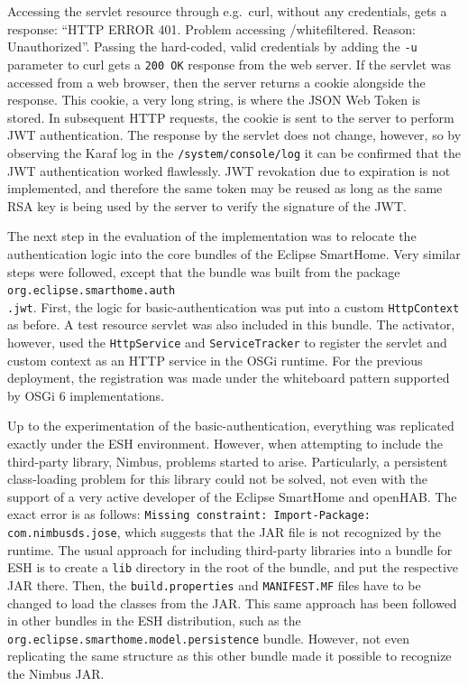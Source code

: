 \documentclass[12pt]{article}
\begin{document}
Accessing the servlet resource through e.g.\ curl, without any credentials, gets a response: ``HTTP ERROR 401. Problem accessing /whitefiltered. Reason: Unauthorized''. Passing the hard-coded, valid credentials by adding the \texttt{-u} parameter to curl gets a \texttt{200 OK} response from the web server. If the servlet was accessed from a web browser, then the server returns a cookie alongside the response. This cookie, a very long string, is where the JSON Web Token is stored. In subsequent HTTP requests, the cookie is sent to the server to perform JWT authentication. The response by the servlet does not change, however, so by observing the Karaf log in the \texttt{/system/console/log} it can be confirmed that the JWT authentication worked flawlessly. JWT revokation due to expiration is not implemented, and therefore the same token may be reused as long as the same RSA key is being used by the server to verify the signature of the JWT.

The next step in the evaluation of the implementation was to relocate the authentication logic into the core bundles of the Eclipse SmartHome. Very similar steps were followed, except that the bundle was built from the package \texttt{org.eclipse.smarthome.auth\\.jwt}. First, the logic for basic-authentication was put into a custom \texttt{HttpContext} as before. A test resource servlet was also included in this bundle. The activator, however, used the \texttt{HttpService} and \texttt{ServiceTracker} to register the servlet and custom context as an HTTP service in the OSGi runtime. For the previous deployment, the registration was made under the whiteboard pattern supported by OSGi 6 implementations.

Up to the experimentation of the basic-authentication, everything was replicated exactly under the ESH environment. However, when attempting to include the third-party library, Nimbus, problems started to arise. Particularly, a persistent class-loading problem for this library could not be solved, not even with the support of a very active developer of the Eclipse SmartHome and openHAB. The exact error is as follows: \texttt{Missing constraint: Import-Package: com.nimbusds.jose}, which suggests that the JAR file is not recognized by the runtime. The usual approach for including third-party libraries into a bundle for ESH is to create a \texttt{lib} directory in the root of the bundle, and put the respective JAR there. Then, the \texttt{build.properties} and \texttt{MANIFEST.MF} files have to be changed to load the classes from the JAR. This same approach has been followed in other bundles in the ESH distribution, such as the \texttt{org.eclipse.smarthome.model.persistence} bundle. However, not even replicating the same structure as this other bundle made it possible to recognize the Nimbus JAR.
\end{document}
